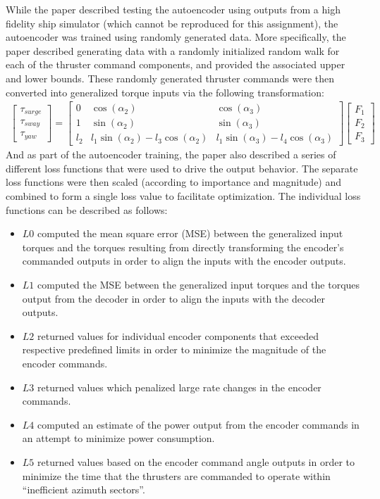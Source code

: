 \documentclass{article}
\begin{document}
While the paper described testing the autoencoder using outputs from a high fidelity ship simulator (which cannot be reproduced for this assignment), the autoencoder was trained using randomly generated data. More specifically, the paper described generating data with a randomly initialized random walk for each of the thruster command components, and provided the associated upper and lower bounds. These randomly generated thruster commands were then converted into generalized torque inputs via the following transformation:
\begin{gather*}
    \begin{bmatrix}
        \tau_{surge} \\
        \tau_{sway} \\
        \tau_{yaw}
    \end{bmatrix}
    =
    \begin{bmatrix}
        0 & \cos \left(\alpha_2\right) & \cos \left(\alpha_3\right) \\ 
        1 & \sin \left(\alpha_2\right) & \sin \left(\alpha_3\right) \\
        l_2 & l_1 \sin \left(\alpha_2\right) - l_3 \cos \left(\alpha_2\right) & l_1 \sin \left(\alpha_3\right) - l_4\cos\left(\alpha_3\right)
    \end{bmatrix}
    \dot{}
    \begin{bmatrix}
        F_1 \\
        F_2 \\
        F_3 
    \end{bmatrix}
\end{gather*}
And as part of the autoencoder training, the paper also described a series of different loss functions that were used to drive the output behavior. The separate loss functions were then scaled (according to importance and magnitude) and combined to form a single loss value to facilitate optimization. The individual loss functions can be described as follows:
\begin{itemize}
    \item $L0$ computed the mean square error (MSE) between the generalized input torques and the torques resulting from directly transforming the encoder's commanded outputs in order to align the inputs with the encoder outputs.
    \item $L1$ computed the MSE between the generalized input torques and the torques output from the decoder in order to align the inputs with the decoder outputs.
    \item $L2$ returned values for individual encoder components that exceeded respective predefined limits in order to minimize the magnitude of the encoder commands.
    \item $L3$ returned values which penalized large rate changes in the encoder commands.
    \item $L4$ computed an estimate of the power output from the encoder commands in an attempt to minimize power consumption.
    \item $L5$ returned values based on the encoder command angle outputs in order to minimize the time that the thrusters are commanded to operate within ``inefficient azimuth sectors''.
\end{itemize}
\end{document}
